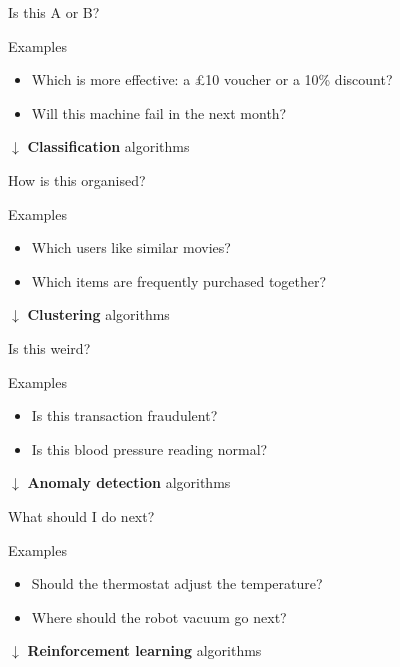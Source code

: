 \begin{frame}{Is this A or B?}
    \begin{block}{Examples}
        \begin{itemize}
            \item Which is more effective: a £10 voucher or a 10\% discount?
            \item Will this machine fail in the next month?
        \end{itemize}
    \end{block}
    \begin{center}
        \large%
        $\downarrow$
        \vfill
        \textbf{Classification} algorithms
    \end{center}
\end{frame}

\begin{frame}{How is this organised?}
    \begin{block}{Examples}
        \begin{itemize}
            \item Which users like similar movies?
            \item Which items are frequently purchased together?
        \end{itemize}
    \end{block}
    \begin{center}
        \large%
        $\downarrow$
        \vfill
        \textbf{Clustering} algorithms
    \end{center}
\end{frame}

\begin{frame}{Is this weird?}
    \begin{block}{Examples}
        \begin{itemize}
            \item Is this transaction fraudulent?
            \item Is this blood pressure reading normal?
        \end{itemize}
    \end{block}
    \begin{center}
        \large%
        $\downarrow$
        \vfill
        \textbf{Anomaly detection} algorithms
    \end{center}
\end{frame}

\begin{frame}{What should I do next?}
    \begin{block}{Examples}
        \begin{itemize}
            \item Should the thermostat adjust the temperature?
            \item Where should the robot vacuum go next?
        \end{itemize}
    \end{block}
    \begin{center}
        \large%
        $\downarrow$
        \vfill
        \textbf{Reinforcement learning} algorithms
    \end{center}
\end{frame}

